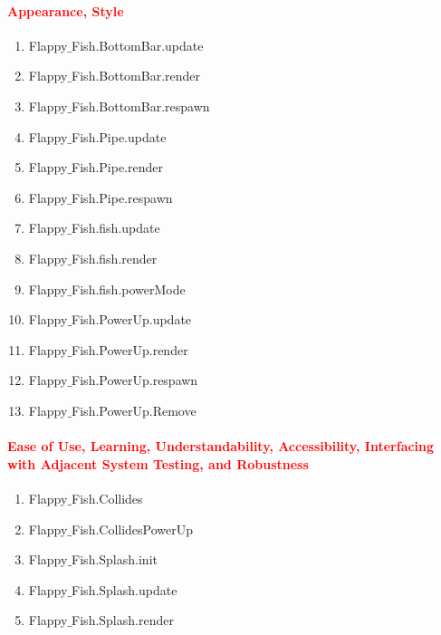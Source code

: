 \documentclass[11pt, oneside]{article}   	%
\begin{document}
\paragraph{\textcolor{red}{Appearance, Style }}
\begin{enumerate}

\item Flappy$\_$Fish.BottomBar.update

\item Flappy$\_$Fish.BottomBar.render

\item Flappy$\_$Fish.BottomBar.respawn

\item Flappy$\_$Fish.Pipe.update

\item Flappy$\_$Fish.Pipe.render

\item Flappy$\_$Fish.Pipe.respawn

\item Flappy$\_$Fish.fish.update

\item Flappy$\_$Fish.fish.render

\item Flappy$\_$Fish.fish.powerMode

\item Flappy$\_$Fish.PowerUp.update

\item Flappy$\_$Fish.PowerUp.render

\item Flappy$\_$Fish.PowerUp.respawn

\item Flappy$\_$Fish.PowerUp.Remove

\end{enumerate}

\paragraph{\textcolor{red}{Ease of Use, Learning, Understandability, Accessibility, Interfacing with Adjacent System Testing, and Robustness  }}
\begin{enumerate}


\item Flappy$\_$Fish.Collides

\item Flappy$\_$Fish.CollidesPowerUp

\item Flappy$\_$Fish.Splash.init

\item Flappy$\_$Fish.Splash.update

\item Flappy$\_$Fish.Splash.render

\end{enumerate}
\end{document}
